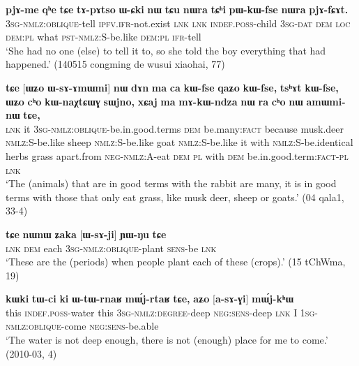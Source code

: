 \documentclass[oneside,a4paper,11pt]{article}
\newcommand{\ipa}[1]{\textbf{{\phon\mbox{#1}}}} %
\begin{document}
 \begin{exe}
\ex \label{ex:WsAfCAt}
\gll
[\ipa{ɯ-sɤ-fɕɤt}] \ipa{pjɤ-me} 	\ipa{qʰe} 	\ipa{tɕe} 	\ipa{tɤ-pɤtso} 	\ipa{ɯ-ɕki} 	\ipa{nɯ} 	\ipa{tɕu} 	\ipa{nɯra} 	\ipa{tɕʰi} 	\ipa{pɯ-kɯ-fse} 	\ipa{nɯra} 	\ipa{pjɤ-fɕɤt.} \\
\textsc{3sg-nmlz:oblique}-tell \textsc{ipfv.ifr}-not.exist \textsc{lnk} \textsc{lnk} \textsc{indef.poss}-child \textsc{3sg-dat} \textsc{dem} \textsc{loc} \textsc{dem:pl} what \textsc{pst-nmlz:S}-be.like  \textsc{dem:pl} \textsc{ifr}-tell \\
\glt `She had no one (else) to tell it to, so she told the boy everything that had happened.' (140515 congming de wusui xiaohai, 77)
\end{exe} 

\begin{exe}
   \ex \label{ex:WsAmWmi}
 \gll 
\ipa{tɕe}   	[\ipa{ɯʑo}   	\ipa{ɯ-sɤ-ɤmɯmi}]  	\ipa{nɯ}   	\ipa{dɤn}   	\ipa{ma}   	\ipa{ca}   	\ipa{kɯ-fse}   	\ipa{qaʑo}   	\ipa{kɯ-fse,}   	\ipa{tsʰɤt}   	\ipa{kɯ-fse,}   	 \ipa{ɯʑo}   	\ipa{cʰo}   	\ipa{kɯ-naχtɕɯɣ}   	\ipa{sɯjno,}   	\ipa{xɕaj}   	\ipa{ma}   	\ipa{mɤ-kɯ-ndza}   	\ipa{nɯ} \ipa{ra}   	\ipa{cʰo}   	\ipa{nɯ}   	\ipa{amɯmi-nɯ}   	\ipa{tɕe,}   \\
\textsc{lnk} it \textsc{3sg-nmlz:oblique}-be.in.good.terms \textsc{dem} be.many:\textsc{fact} because musk.deer \textsc{nmlz:S}-be.like sheep \textsc{nmlz:S}-be.like goat  \textsc{nmlz:S}-be.like it with  \textsc{nmlz:S}-be.identical herbs grass apart.from \textsc{neg-nmlz:A}-eat \textsc{dem} \textsc{pl} with \textsc{dem} be.in.good.term:\textsc{fact}-\textsc{pl} \textsc{lnk} \\
\glt `The (animals) that are in good terms with the rabbit are many, it is in good terms with those that only eat grass, like musk deer, sheep or goats.' (04 qala1, 33-4)
\end{exe}

\begin{exe}
   \ex \label{ex:WsAji}
   \gll
   \ipa{tɕe} 	\ipa{nɯnɯ} 	\ipa{ʑaka} 	[\ipa{ɯ-sɤ-ji}] 	\ipa{ɲɯ-ŋu} 	\ipa{tɕe}\\
   \textsc{lnk} \textsc{dem} each \textsc{3sg-nmlz:oblique}-plant \textsc{sens}-be \textsc{lnk}\\
\glt `These are the (periods) when people plant each of these (crops).' (15 tChWma, 19)
\end{exe}

\begin{exe}
   \ex \label{ex:asAGi}
 \gll
\ipa{kɯki}   	\ipa{tɯ-ci}   	\ipa{ki}   	\ipa{ɯ-tɯ-rnaʁ}   	\ipa{mɯ́j-rtaʁ}   	\ipa{tɕe,}   	\ipa{aʑo}   	[\ipa{a-sɤ-ɣi}]   	\ipa{mɯ́j-kʰɯ}   \\
this \textsc{indef.poss}-water this \textsc{3sg-nmlz:degree}-deep \textsc{neg:sens}-deep \textsc{lnk} I \textsc{1sg-nmlz:oblique}-come \textsc{neg:sens}-be.able \\
\glt `The water is not deep enough, there is not (enough) place for me to come.' (2010-03, 4)
\end{exe}
\end{document}
